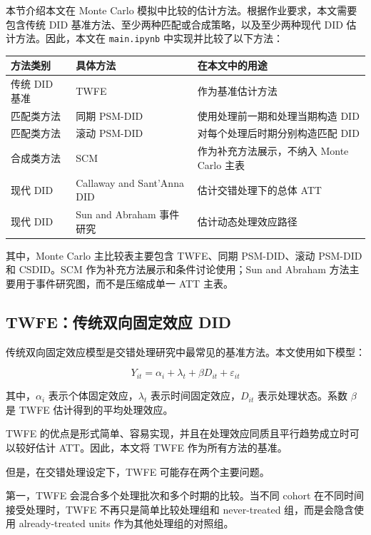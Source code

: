 \documentclass[
  fontset=windows]{ctexart}
\newcounter{none} %
\begin{document}
本节介绍本文在 Monte Carlo
模拟中比较的估计方法。根据作业要求，本文需要包含传统 DID
基准方法、至少两种匹配或合成策略，以及至少两种现代 DID
估计方法。因此，本文在 \texttt{main.ipynb} 中实现并比较了以下方法：

{\def\LTcaptype{none} %
\begin{longtable}[]{@{}lll@{}}
\toprule\noalign{}
方法类别 & 具体方法 & 在本文中的用途 \\
\midrule\noalign{}
\endhead
\bottomrule\noalign{}
\endlastfoot
传统 DID 基准 & TWFE & 作为基准估计方法 \\
匹配类方法 & 同期 PSM-DID & 使用处理前一期和处理当期构造 DID \\
匹配类方法 & 滚动 PSM-DID & 对每个处理后时期分别构造匹配 DID \\
合成类方法 & SCM & 作为补充方法展示，不纳入 Monte Carlo 主表 \\
现代 DID & Callaway and Sant'Anna DID & 估计交错处理下的总体 ATT \\
现代 DID & Sun and Abraham 事件研究 & 估计动态处理效应路径 \\
\end{longtable}
}

其中，Monte Carlo 主比较表主要包含 TWFE、同期 PSM-DID、滚动 PSM-DID 和
CSDID。SCM 作为补充方法展示和条件讨论使用；Sun and Abraham
方法主要用于事件研究图，而不是压缩成单一 ATT 主表。

\subsection{TWFE：传统双向固定效应
DID}\label{twfeux4f20ux7edfux53ccux5411ux56faux5b9aux6548ux5e94-did}

传统双向固定效应模型是交错处理研究中最常见的基准方法。本文使用如下模型：

\[
Y_{it}=\alpha_i+\lambda_t+\beta D_{it}+\varepsilon_{it}
\]

其中，\(\alpha_i\) 表示个体固定效应，\(\lambda_t\)
表示时间固定效应，\(D_{it}\) 表示处理状态。系数 \(\beta\) 是 TWFE
估计得到的平均处理效应。

TWFE
的优点是形式简单、容易实现，并且在处理效应同质且平行趋势成立时可以较好估计
ATT。因此，本文将 TWFE 作为所有方法的基准。

但是，在交错处理设定下，TWFE 可能存在两个主要问题。

第一，TWFE 会混合多个处理批次和多个时期的比较。当不同 cohort
在不同时间接受处理时，TWFE 不再只是简单比较处理组和 never-treated
组，而是会隐含使用 already-treated units 作为其他处理组的对照组。
\end{document}
